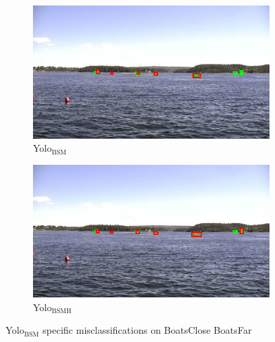 \begin{figure}[h!]
\begin{subfigure}{.5\textwidth}
  \centering
  \includegraphics[width=0.9\linewidth]{results/case_buildings/yolo23/3better/yolo2/selected_06_25_frame0057.jpg}
  \caption{Yolo$_{\text{BSM}}$}
\end{subfigure}%
\begin{subfigure}{.5\textwidth}
  \centering
  \includegraphics[width=.9\linewidth]{results/case_buildings/yolo23/3better/yolo3/selected_06_25_frame0057.jpg}
  \caption{Yolo$_{\text{BSMH}}$}
\end{subfigure}
\caption{Yolo$_{\text{BSM}}$ specific misclassifications on BoatsClose BoatsFar}
\label{img:yolo2_misclas}


\end{figure}
